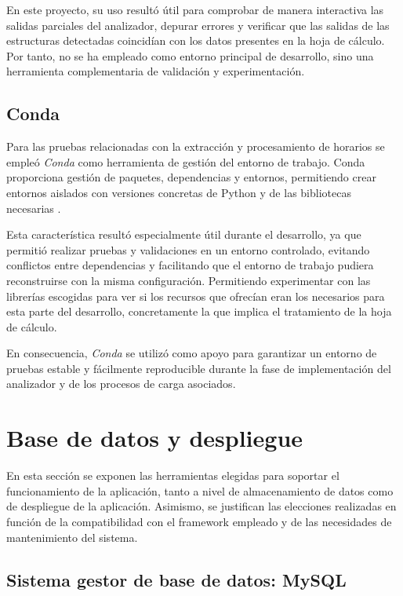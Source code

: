 En este proyecto, su uso resultó útil para comprobar de manera interactiva las salidas parciales del analizador, depurar errores y verificar que las salidas de las estructuras detectadas coincidían con los datos presentes en la hoja de cálculo. Por tanto, no se ha empleado como entorno principal de desarrollo, sino una herramienta complementaria de validación y experimentación.

\subsection{Conda}

Para las pruebas relacionadas con la extracción y procesamiento de horarios se empleó \textit{Conda} como herramienta de gestión del entorno de trabajo. Conda proporciona gestión de paquetes, dependencias y entornos, permitiendo crear entornos aislados con versiones concretas de Python y de las bibliotecas necesarias \cite{conda_docs, conda_taller}.

Esta característica resultó especialmente útil durante el desarrollo, ya que permitió realizar pruebas y validaciones en un entorno controlado, evitando conflictos entre dependencias y facilitando que el entorno de trabajo pudiera reconstruirse con la misma configuración. Permitiendo experimentar con las librerías escogidas para ver si los recursos que ofrecían eran los necesarios para esta parte del desarrollo, concretamente la que implica el tratamiento de la hoja de cálculo.

En consecuencia, \textit{Conda} se utilizó como apoyo para garantizar un entorno de pruebas estable y fácilmente reproducible durante la fase de implementación del analizador y de los procesos de carga asociados.

\section{Base de datos y despliegue}

En esta sección se exponen las herramientas elegidas para soportar el funcionamiento de la aplicación, tanto a nivel de almacenamiento de datos como de despliegue de la aplicación. Asimismo, se justifican las elecciones realizadas en función de la compatibilidad con el framework empleado y de las necesidades de mantenimiento del sistema.

\subsection{Sistema gestor de base de datos: MySQL}


